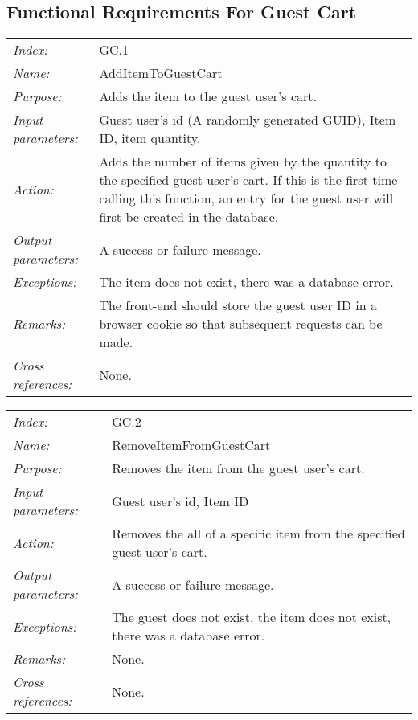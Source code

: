 \documentclass[10pt,letter]{article}
\begin{document}
\subsection{Functional Requirements For Guest Cart}

\begin{tabularx}{\textwidth}{l X}
    \it{Index:} & GC.1 \\
    \it{Name:} & AddItemToGuestCart \\
    \it{Purpose:} & Adds the item to the guest user's cart. \\
    \it{Input parameters:} & Guest user's id (A randomly generated GUID), Item ID, item quantity. \\
    \it{Action:} & Adds the number of items given by the quantity to the specified guest user's cart. If this is the first time calling this function, 
    an entry for the guest user will first be created in the database.\\
    \it{Output parameters:} & A success or failure message. \\
    \it{Exceptions:} & The item does not exist, there was a database error. \\
    \it{Remarks:} & The front-end should store the guest user ID in a browser cookie so that subsequent requests can be made. \\
    \it{Cross references:} & None. \\
    \hline
\end{tabularx}

\begin{tabularx}{\textwidth}{l X}
    \it{Index:} & GC.2 \\
    \it{Name:} & RemoveItemFromGuestCart \\
    \it{Purpose:} & Removes the item from the guest user's cart. \\
    \it{Input parameters:} & Guest user's id, Item ID \\
    \it{Action:} & Removes the all of a specific item from the specified guest user's cart. \\
    \it{Output parameters:} & A success or failure message. \\
    \it{Exceptions:} & The guest does not exist, the item does not exist, there was a database error. \\
    \it{Remarks:} & None. \\
    \it{Cross references:} & None. \\
    \hline
\end{tabularx}
\end{document}
